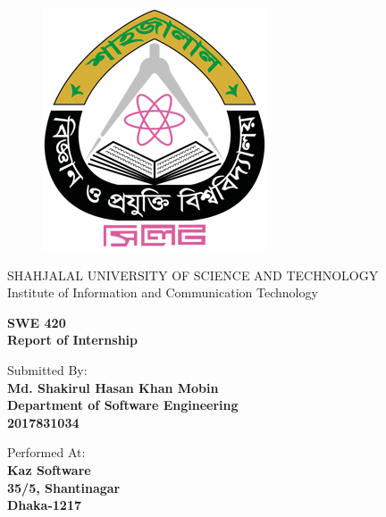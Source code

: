 \begin{titlepage}
\begin{figure}[!htb]
    \centering
    \includegraphics[keepaspectratio=true,scale=2]{images/Frontpage/sustlogo.png}
\end{figure}

\begin{center}
    \LARGE{SHAHJALAL UNIVERSITY OF SCIENCE AND TECHNOLOGY}
    \vspace{5mm}
    \\ \LARGE{Institute of Information and Communication Technology}
\end{center}

\vspace{15mm}
\begin{center}
    {\LARGE{\bf SWE 420\\ \vspace{5mm} Report of Internship }}
    
    
\end{center}
\vspace{30mm}

\begin{minipage}[t]{0.6\textwidth}
	{\large{Submitted By:}{\normalsize\vspace{3mm}
	\bf\\ \large{Md. Shakirul Hasan Khan Mobin} \normalsize\vspace{2mm} \\ Department of Software Engineering \\ 2017831034}}
\end{minipage}
\hfill
\begin{minipage}[t]{0.35\textwidth}\raggedleft
	{\large{Performed At:}{\normalsize\vspace{3mm} \bf\\ \large{Kaz Software}\normalsize\vspace{2mm}\\ 35/5, Shantinagar \\ Dhaka-1217}}
\end{minipage}

\vspace{30mm}
\hrulefill
\\

\end{titlepage}